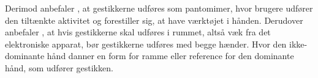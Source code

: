 Derimod anbefaler \textcite[s. 823]{PDF:UnderstandingNaturalness}, at gestikkerne udføres som pantomimer, hvor brugere udfører den tiltænkte aktivitet og forestiller sig, at have værktøjet i hånden. Derudover anbefaler \textcite[s. 824]{PDF:UnderstandingNaturalness}, at hvis gestikkerne skal udføres i rummet, altså væk fra det elektroniske apparat, bør gestikkerne udføres med begge hænder. Hvor den ikke-dominante hånd danner en form for ramme eller reference for den dominante hånd, som udfører gestikken.      
%
